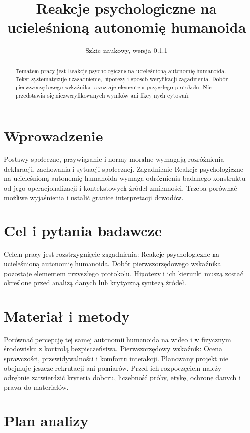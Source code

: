 \documentclass[11pt,a4paper]{article}
\title{Reakcje psychologiczne na ucieleśnioną autonomię humanoida}
\author{}
\date{Szkic naukowy, wersja 0.1.1}
\begin{document}
\maketitle

\begin{abstract}

Tematem pracy jest Reakcje psychologiczne na ucieleśnioną autonomię humanoida. Tekst systematyzuje uzasadnienie, hipotezy i sposób weryfikacji zagadnienia. Dobór pierwszorzędowego wskaźnika pozostaje elementem przyszłego protokołu. Nie przedstawia się niezweryfikowanych wyników ani fikcyjnych cytowań.

\end{abstract}

\section{Wprowadzenie}

Postawy społeczne, przywiązanie i normy moralne wymagają rozróżnienia deklaracji, zachowania i sytuacji społecznej. Zagadnienie Reakcje psychologiczne na ucieleśnioną autonomię humanoida wymaga odróżnienia badanego konstruktu od jego operacjonalizacji i kontekstowych źródeł zmienności. Trzeba porównać możliwe wyjaśnienia i ustalić granice interpretacji dowodów.

\section{Cel i pytania badawcze}

Celem pracy jest rozstrzygnięcie zagadnienia: Reakcje psychologiczne na ucieleśnioną autonomię humanoida. Dobór pierwszorzędowego wskaźnika pozostaje elementem przyszłego protokołu. Hipotezy i ich kierunki muszą zostać określone przed analizą danych lub krytyczną syntezą źródeł.

\section{Materiał i metody}

Porównać percepcję tej samej autonomii humanoida na wideo i w fizycznym środowisku z kontrolą bezpieczeństwa. Pierwszorzędowy wskaźnik: Ocena sprawczości, przewidywalności i komfortu interakcji. Planowany projekt nie obejmuje jeszcze rekrutacji ani pomiarów. Przed ich rozpoczęciem należy odrębnie zatwierdzić kryteria doboru, liczebność próby, etykę, ochronę danych i prawa do materiałów.

\section{Plan analizy}
\end{document}
